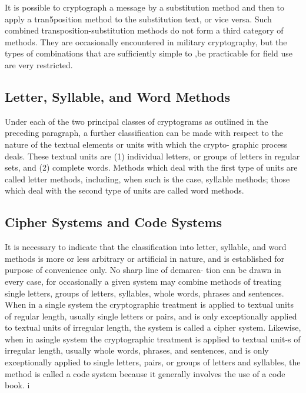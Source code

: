 \mypara It is possible to cryptograph a message by a substitution method
and then to apply a tran5position method to the substitution text, or vice
versa. Such combined transposition-substitution methods do not form a
third category of methods. They are occasionally encountered in military
cryptography, but the types of combinations that are sufﬁciently simple to
,be practicable for ﬁeld use are very restricted.

\subsection{Letter, Syllable, and Word Methods}

Under each of the two principal classes of cryptograms as outlined in
the preceding paragraph, a further classiﬁcation can be made with respect
to the nature of the textual elements or units with which the crypto-
graphic process deals. These textual units are (1) individual letters, or
groups of letters in regular sets, and (2) complete words. Methods which
deal with the ﬁrst type of units are called letter methods, including, when
such is the case, syllable methods; those which deal with the second type
of units are called word methods.

\subsection{Cipher Systems and Code Systems}

It is necessary to indicate that the classiﬁcation into letter, syllable,
and word methods is more or less arbitrary or artiﬁcial in nature, and is
established for purpose of convenience only. No sharp line of demarca-
tion can be drawn in every case, for occasionally a given system may
combine methods of treating single letters, groups of letters, syllables,
whole words, phrases and sentences. When in a single system the
cryptographic treatment is applied to textual units of regular length,
usually single letters or pairs, and is only exceptionally applied to textual
units of irregular length, the system is called a cipher system. Likewise,
when in asingle system the cryptographic treatment is applied to textual
unit-s of irregular length, usually whole words, phrases, and sentences,
and is only exceptionally applied to single letters, pairs, or groups of
letters and syllables, the method is called a code system because it
generally involves the use of a code book. i

 


